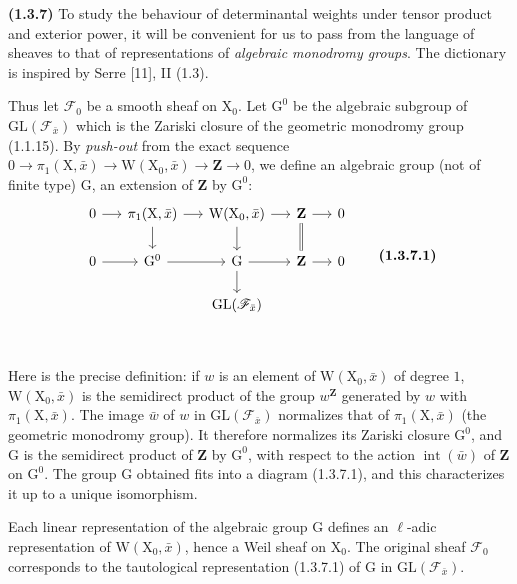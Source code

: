 \documentclass[11pt,leqno]{article}
\newcommand{\Page}[1]{\ifvmode\noindent\else\unskip\ \fi{\footnotesize\textcolor{gray}{[p.\,#1]}}\ \ignorespaces}
\begin{document}
\textbf{(1.3.7)} To study the behaviour of determinantal weights under tensor product and exterior power, it will be convenient for us to pass from the language of sheaves to that of representations of \textit{algebraic monodromy groups}. The dictionary is inspired by Serre [11], II (1.3).

Thus let \(\mathscr{F}_0\) be a smooth sheaf on \(\mathrm{X}_0\). Let \(\mathrm{G}^0\) be the algebraic subgroup of \(\mathrm{GL}(\mathscr{F}_{\bar{x}})\) which is the Zariski closure of the geometric monodromy group (1.1.15). By \textit{push-out} from the exact sequence \(0\to\pi_1(\mathrm{X},\bar{x})\to\mathrm{W}(\mathrm{X}_0,\bar{x})\to\mathbf{Z}\to0\), we define an algebraic group (not of finite type) \(\mathrm{G}\), an extension of \(\mathbf{Z}\) by \(\mathrm{G}^0\):
\[
\begin{tikzcd}[column sep=1.4em,row sep=1.6em]
0 \arrow[r]
  & \pi_1(\mathrm{X},\bar{x}) \arrow[r] \arrow[d]
  & \mathrm{W}(\mathrm{X}_0,\bar{x}) \arrow[r] \arrow[d]
  & \mathbf{Z} \arrow[r] \arrow[d,equal]
  & 0 \\
0 \arrow[r]
  & \mathrm{G}^0 \arrow[r]
  & \mathrm{G} \arrow[r] \arrow[d]
  & \mathbf{Z} \arrow[r]
  & 0 \\
  & & \mathrm{GL}(\mathscr{F}_{\bar{x}})
\end{tikzcd}
\tag*{\textbf{(1.3.7.1)}}
\]

\Page{159}

Here is the precise definition: if \(w\) is an element of \(\mathrm{W}(\mathrm{X}_0,\bar{x})\) of degree \(1\), \(\mathrm{W}(\mathrm{X}_0,\bar{x})\) is the semidirect product of the group \(w^{\mathbf{Z}}\) generated by \(w\) with \(\pi_1(\mathrm{X},\bar{x})\). The image \(\bar{w}\) of \(w\) in \(\mathrm{GL}(\mathscr{F}_{\bar{x}})\) normalizes that of \(\pi_1(\mathrm{X},\bar{x})\) (the geometric monodromy group). It therefore normalizes its Zariski closure \(\mathrm{G}^0\), and \(\mathrm{G}\) is the semidirect product of \(\mathbf{Z}\) by \(\mathrm{G}^0\), with respect to the action \(\operatorname{int}(\bar{w})\) of \(\mathbf{Z}\) on \(\mathrm{G}^0\). The group \(\mathrm{G}\) obtained fits into a diagram (1.3.7.1), and this characterizes it up to a unique isomorphism.

Each linear representation of the algebraic group \(\mathrm{G}\) defines an \(\ell\)-adic representation of \(\mathrm{W}(\mathrm{X}_0,\bar{x})\), hence a Weil sheaf on \(\mathrm{X}_0\). The original sheaf \(\mathscr{F}_0\) corresponds to the tautological representation (1.3.7.1) of \(\mathrm{G}\) in \(\mathrm{GL}(\mathscr{F}_{\bar{x}})\).
\end{document}
